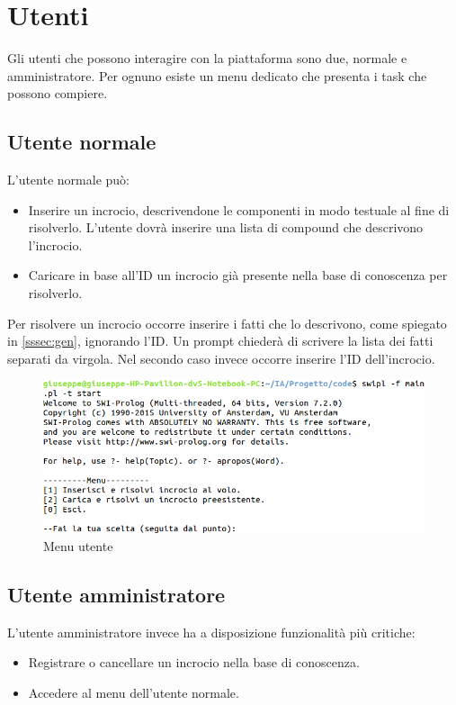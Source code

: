 \section{Utenti}
\label{sec:users}
Gli utenti che possono interagire con la piattaforma sono due, normale e amministratore. Per ognuno esiste un menu dedicato che presenta i task che possono compiere.

\subsection{Utente normale}
L'utente normale può:
\begin{itemize}
	\item Inserire un incrocio, descrivendone le componenti in modo testuale al fine di risolverlo. L'utente dovrà inserire una lista di compound che descrivono l'incrocio.
	\item Caricare in base all'ID un incrocio già presente nella base di conoscenza per risolverlo.
\end{itemize}

Per risolvere un incrocio occorre inserire i fatti che lo descrivono, come spiegato in \ref{sssec:gen}, ignorando l'ID. Un prompt chiederà di scrivere la lista dei fatti separati da virgola. Nel secondo caso invece occorre inserire l'ID dell'incrocio.

\begin{figure}[!hbtp]
	\includegraphics[width=\textwidth]{images/shell/user}
	\caption{Menu utente}
\end{figure}


\subsection{Utente amministratore}
L'utente amministratore invece ha a disposizione funzionalità più critiche:
\begin{itemize}
	\item Registrare o cancellare un incrocio nella base di conoscenza.
	\item Accedere al menu dell'utente normale.
\end{itemize}

